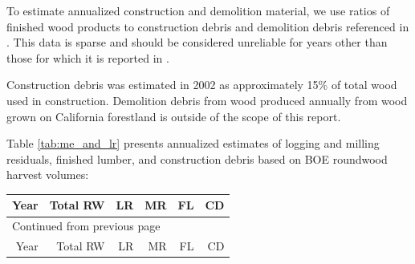 \documentclass[a4paper]{article}
\begin{document}
To estimate annualized construction and demolition material, we use ratios of finished wood products to construction debris and demolition debris referenced in \citet{McKeever2004}. This data is sparse and should be considered unreliable for years other than those for which it is reported in  \citeauthor{McKeever2004}. 

Construction debris was estimated in 2002 as approximately 15\% of total wood used in construction. Demolition debris from wood produced annually from wood grown on California forestland is outside of the scope of this report.


Table \ref{tab:me_and_lr} presents annualized estimates of logging and milling residuals, finished lumber, and construction debris based on BOE roundwood harvest volumes:

\begin{longtable}{rrrrrr}
Year & Total RW & LR & MR & FL & CD\\
\hline
\endfirsthead
\multicolumn{6}{l}{Continued from previous page} \\
\hline

Year & Total RW & LR & MR & FL & CD \\


\end{longtable}
\end{document}

